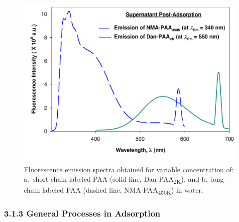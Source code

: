 \documentclass[journal=mamobx,manuscript=article]{achemso}
\begin{document}
\begin{figure}[H]
\includegraphics[scale=0.45]{Figure6_.pdf}
\caption{Fluorescence emission spectra obtained for variable concentration of: a.\ short-chain labeled PAA (solid line, Dan-PAA\textsubscript{2K}), and b.\ long-chain labeled PAA (dashed line, NMA-PAA\textsubscript{450K}) in water.}
\label{figure 6}
\end{figure}



\subsubsection{3.1.3 General Processes in Adsorption}  %
     \label{sec-res-gen}
\end{document}
